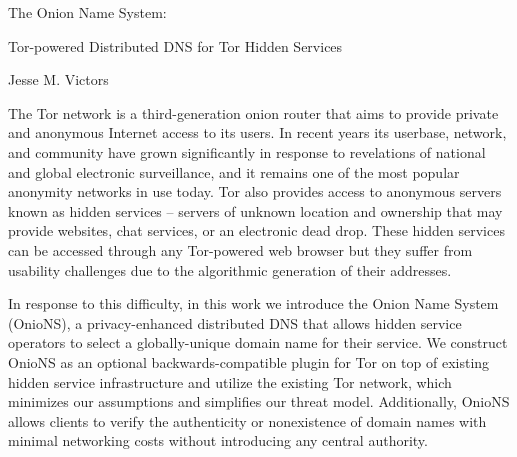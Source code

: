 \begin{publicabstract}
\vspace{12pt}
\centerline{The Onion Name System:}
\centerline{Tor-powered Distributed DNS for Tor Hidden Services}
\centerline{Jesse M. Victors}
\vspace{24pt}

The Tor network is a third-generation onion router that aims to provide private and anonymous Internet access to its users. In recent years its userbase, network, and community have grown significantly in response to revelations of national and global electronic surveillance, and it remains one of the most popular anonymity networks in use today. Tor also provides access to anonymous servers known as hidden services -- servers of unknown location and ownership that may provide websites, chat services, or an electronic dead drop. These hidden services can be accessed through any Tor-powered web browser but they suffer from usability challenges due to the algorithmic generation of their addresses.

In response to this difficulty, in this work we introduce the Onion Name System (OnioNS), a privacy-enhanced distributed DNS that allows hidden service operators to select a globally-unique domain name for their service. We construct OnioNS as an optional backwards-compatible plugin for Tor on top of existing hidden service infrastructure and utilize the existing Tor network, which minimizes our assumptions and simplifies our threat model. Additionally, OnioNS allows clients to verify the authenticity or nonexistence of domain names with minimal networking costs without introducing any central authority.

\end{publicabstract}

